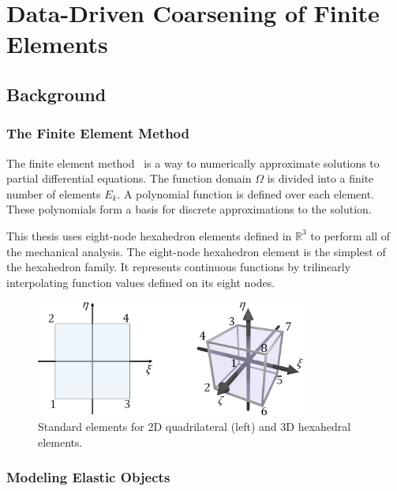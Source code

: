 \chapter{Data-Driven Coarsening of Finite Elements}
\section{Background}
\subsection{The Finite Element Method}
The finite element method~\citep{ciarlet2002finite} is a way to numerically approximate solutions to partial differential equations.
The function domain $\Omega$ is divided into a finite number of elements $E_k$.
A polynomial function is defined over each element.
These polynomials form a basis for discrete approximations to the solution.

This thesis uses eight-node hexahedron elements defined in $\mathbb{R}^3$
to perform all of the mechanical analysis.
The eight-node hexahedron element is the simplest of the hexahedron family.
It represents continuous functions by trilinearly interpolating function values defined on its eight nodes.
\begin{figure}
\centering
\includegraphics[width=0.8\textwidth]{figs/refEle.png}
\caption{Standard elements for 2D quadrilateral (left) and 3D hexahedral elements.}
\label{fig:standardEle}
\end{figure}
\subsection{Modeling Elastic Objects}

\section{}

